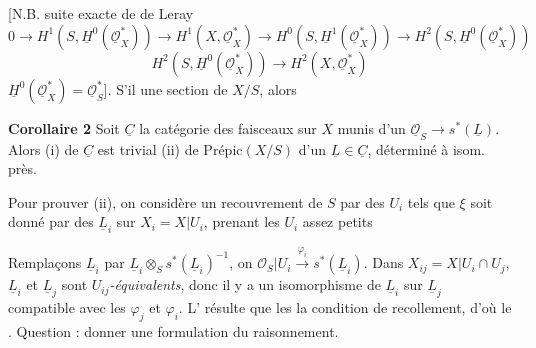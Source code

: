 \documentclass[11pt,a4paper]{article}
\begin{document}
[N.B. \ill{} \ill{} \ill{} \ill{} \ill{} \ill{} suite exacte \ill{} \ill{} \ill{} \ill{} \ill{} \ill{} \ill{} \ill{}  de \ill{} \ill{} \ill{} de Leray
\[
0 \to H^{1}(S, \underline{H}^{0}(\underline{\mathcal{O}}_{X}^{*})) \to H^{1}(X, \underline{\mathcal{O}}_{X}^{*}) \to H^{0}(S, \underline{H}^{1}(\underline{\mathcal{O}}_{X}^{*})) \to H^{2}(S, \underline{H}^{0}(\underline{\mathcal{O}}_{X}^{*}))
\]
\[
H^{2}(S, \underline{H}^{0}(\underline{\mathcal{O}}_{X}^{*})) \to H^{2}(X, \underline{\mathcal{O}}_{X}^{*})
\]
 \ill{} \ill{} $\underline{H}^{0}(\underline{\mathcal{O}}_{X}^{*}) = \underline{\mathcal{O}}_{S}^{*}$]. S'il  une section de $X/S$, alors \ill{} \struck{\ill{}}
\struck{\ill{} \ill{} \ill{} \ill{}}
\ill{}   \ill{}


\textbf{Corollaire 2} Soit $\underline{C}$ la catégorie des faisceaux \ill{} sur $X$ munis d'un \emph{} $\underline{\mathcal{O}}_{S} \to s^{*}(\underline{L})$. Alors (i)  \ill{}  \ill{} \ill{} \ill{} de $\underline{C}$ est trivial (ii)  \struck{\ill{}} \ill{} de $\text{Prépic}(X/S)$  d'un $\underline{L} \in \underline{C}$, déterminé à isom.  près.

Pour prouver (ii), on considère un recouvrement de $S$ par des $U_{i}$ tels que $\xi$ soit donné par des $\underline{L}_{i}$ sur $X_{i} = X|U_{i}$, prenant les $U_{i}$ assez petits


Remplaçons $\underline{L}_{i}$ par $\underline{L}_{i} \otimes_{S} s^{*}(\underline{L}_{i})^{-1}$, on \ill{}  \ill{} \ill{} \ill{}  $\mathcal{O}_{S}|U_{i} \xrightarrow{\varphi_{i}} s^{*}(\underline{L}_{i})$. Dans $X_{ij} = X|U_{i} \cap U_{j}$, $\underline{L}_{i}$ et $\underline{L}_{j}$ sont \emph{$U_{ij}$-équivalents}, donc il y a un isomorphisme \struck{\ill{}} \ill{} \ill{} de $\underline{L}_{i}$ sur $\underline{L}_{j}$ compatible avec les $\varphi_{j}$ et $\varphi_{i}$. \struck{\ill{}} L' résulte que les \ill{}  la condition de recollement, d'où le . Question : donner une formulation  du raisonnement.
\end{document}
